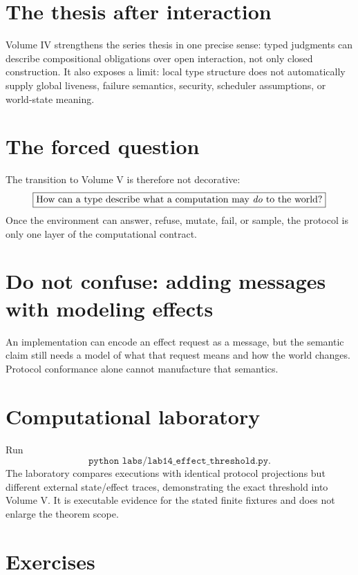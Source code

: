 \section{The thesis after interaction}
\begin{principle}
Volume IV strengthens the series thesis in one precise sense: typed judgments can describe compositional obligations over open interaction, not only closed construction. It also exposes a limit: local type structure does not automatically supply global liveness, failure semantics, security, scheduler assumptions, or world-state meaning.
\end{principle}



\section{The forced question}
The transition to Volume V is therefore not decorative:
\[
\boxed{\text{How can a type describe what a computation may \emph{do} to the world?}}
\]
Once the environment can answer, refuse, mutate, fail, or sample, the protocol is only one layer of the computational contract.

\section{Do not confuse: adding messages with modeling effects}
\begin{warningbox}
An implementation can encode an effect request as a message, but the semantic claim still needs a model of what that request means and how the world changes. Protocol conformance alone cannot manufacture that semantics.
\end{warningbox}



\section{Computational laboratory}
\begin{labbox}
Run
\[
  \texttt{python labs/lab14_effect_threshold.py}.
\]
The laboratory compares executions with identical protocol projections but different external state/effect traces, demonstrating the exact threshold into Volume V. It is executable evidence for the stated finite fixtures and does not enlarge the theorem scope.
\end{labbox}

\section{Exercises}
